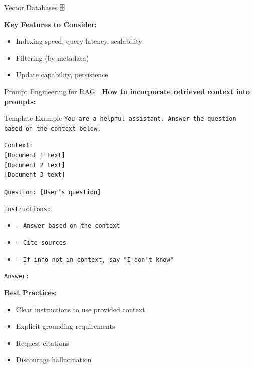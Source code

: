 \documentclass[aspectratio=169]{beamer}
\begin{document}
\begin{frame}[shrink=10]{Vector Databases 🗄️}
\vspace{0.5em}

\textbf{Key Features to Consider:}
\begin{itemize}\setlength{\itemsep}{0pt}
    \item Indexing speed, query latency, scalability
    \item Filtering (by metadata)
    \item Update capability, persistence
\end{itemize}
\end{frame}

\begin{frame}[shrink=10]{Prompt Engineering for RAG 📝}
\textbf{How to incorporate retrieved context into prompts:}

\vspace{0.5em}

\begin{block}{Template Example}
\small
\texttt{You are a helpful assistant. Answer the question based on the context below.}

\vspace{0.3em}

\texttt{Context:}\\
\texttt{[Document 1 text]}\\
\texttt{[Document 2 text]}\\
\texttt{[Document 3 text]}

\vspace{0.3em}

\texttt{Question: [User's question]}

\vspace{0.3em}

\texttt{Instructions:}
\begin{itemize}\setlength{\itemsep}{0pt}
    \item \texttt{- Answer based on the context}
    \item \texttt{- Cite sources}
    \item \texttt{- If info not in context, say "I don't know"}
\end{itemize}

\texttt{Answer:}
\end{block}

\vspace{0.5em}

\textbf{Best Practices:}
\begin{itemize}\setlength{\itemsep}{0pt}
    \item Clear instructions to use provided context
    \item Explicit grounding requirements
    \item Request citations
    \item Discourage hallucination
\end{itemize}
\end{frame}
\end{document}
